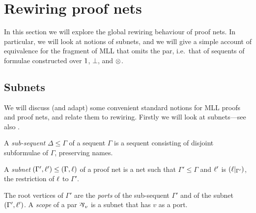 \documentclass[conference]{IEEEtran}
\begin{document}
\section{Rewiring proof nets}



In this section we will explore the global rewiring behaviour of proof nets.
%
In particular, we will look at notions of subnets, and we will give a simple account of equivalence for the fragment of MLL that omits the par, i.e.\ that of sequents of formulae constructed over $1$, $\bot$, and $\otimes$.




\subsection*{Subnets}


We will discuss (and adapt) some convenient standard notions for MLL proofs and proof nets, and relate them to rewiring.
%
Firstly we will look at subnets---see also \cite{Bellin-vandeWiele-1995}.


\begin{definition}
A \emph{sub-sequent} $\Delta\leq\Gamma$ of a sequent $\Gamma$ is a sequent consisting of disjoint subformulae of $\Gamma$, preserving names.
\end{definition}

\begin{definition}
A \emph{subnet} $(\Gamma',\ell') \leq (\Gamma,\ell)$ of a proof net is a net such that $\Gamma'\leq\Gamma$ and $\ell'$ is $(\ell|_{\Gamma'})$, the restriction of $\ell$ to $\Gamma'$.
\end{definition}


The root vertices of $\Gamma'$ are the \emph{ports} of the sub-sequent $\Gamma'$ and of the subnet $(\Gamma',\ell')$.
%
A \emph{scope} of a par $\named v\parr$ is a subnet that has $v$ as a port.
\end{document}
